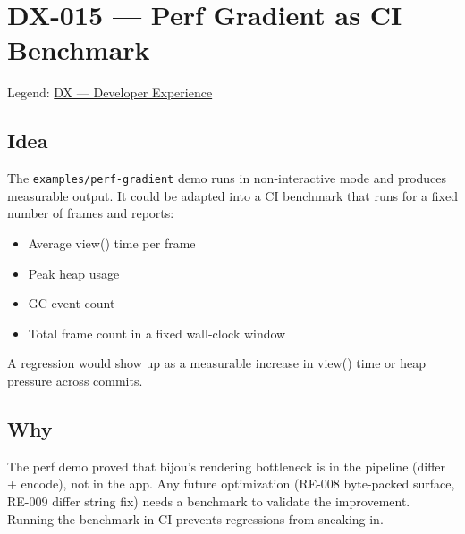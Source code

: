 \chapter{DX-015 --- Perf Gradient as CI Benchmark}\label{record-320}

\smallskip

Legend: \href{https://github.com/flyingrobots/bijou/blob/cbd70612140e7a450d764b3c7be1c6af878b99bc/docs/method/graveyard/legends/DX-developer-experience.md}{DX --- Developer Experience}

\section{Idea}\label{record-320-idea}

The \texttt{e\allowbreak{}x\allowbreak{}a\allowbreak{}m\allowbreak{}p\allowbreak{}l\allowbreak{}e\allowbreak{}s\allowbreak{}/\allowbreak{}p\allowbreak{}e\allowbreak{}r\allowbreak{}f\allowbreak{}-\allowbreak{}g\allowbreak{}r\allowbreak{}a\allowbreak{}d\allowbreak{}i\allowbreak{}e\allowbreak{}n\allowbreak{}t} demo runs in non-interactive mode and produces measurable output. It could be adapted into a CI benchmark that runs for a fixed number of frames and reports:

\begin{itemize}
\tightlist
\item
  Average view() time per frame
\item
  Peak heap usage
\item
  GC event count
\item
  Total frame count in a fixed wall-clock window
\end{itemize}

A regression would show up as a measurable increase in view() time or heap pressure across commits.

\section{Why}\label{record-320-why}

The perf demo proved that bijou's rendering bottleneck is in the pipeline (differ + encode), not in the app. Any future optimization (RE-008 byte-packed surface, RE-009 differ string fix) needs a benchmark to validate the improvement. Running the benchmark in CI prevents regressions from sneaking in.

